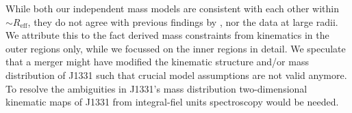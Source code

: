 \documentclass[useAMS,usenatbib]{mnras}
\begin{document}
While both our independent mass models are consistent with each other within $\sim R_\text{eff}$, they do not agree with previous findings by \citet{SWELLSV}, nor the data at large radii. We attribute this to the fact \citet{SWELLSV} derived mass constraints from kinematics in the outer regions only, while we focussed on the inner regions in detail. We speculate that a merger might have modified the kinematic structure and/or mass distribution of J1331 such that crucial model assumptions are not valid anymore. To resolve the ambiguities in J1331's mass distribution two-dimensional kinematic maps of J1331 from integral-fiel units spectroscopy would be needed.






\label{lastpage}
\end{document}
